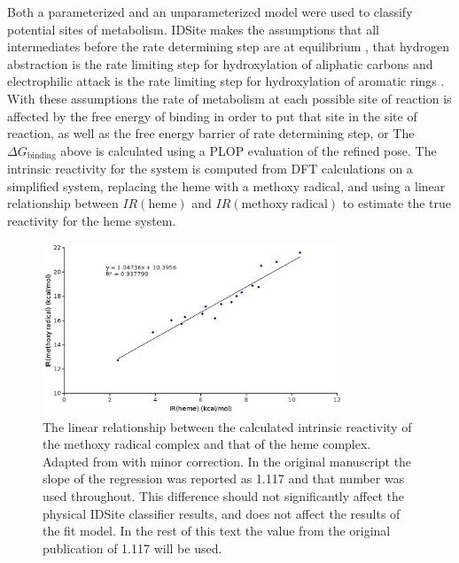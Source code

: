 Both a parameterized and an unparameterized model were used to classify potential sites of metabolism.
IDSite makes the assumptions that all intermediates before the rate determining step are at equilibrium \cite{wang2007stochastic}, that hydrogen abstraction is the rate limiting step for hydroxylation of aliphatic carbons and electrophilic attack is the rate limiting step for hydroxylation of aromatic rings \cite{guengerich2001common,shaik2005theoretical}.
With these assumptions the rate of metabolism at each possible site of reaction is affected by the free energy of binding in order to put that site in the site of reaction, as well as the free energy barrier of rate determining step, or
The ${\Delta}G_{\mathrm{binding}}$ above is calculated using a PLOP evaluation of the refined pose.
The intrinsic reactivity for the system is computed from DFT calculations on a simplified system, replacing the heme with a methoxy radical, and using a linear relationship between $IR(\mathrm{heme})$ and $IR(\mathrm{methoxy\ radical})$ to estimate the true reactivity for the heme system.
\begin{figure}[h]
\centering
\includegraphics[width=0.8\textwidth]{figures/idsite/intrinsic_corrected.png}
\caption{The linear relationship between the calculated intrinsic reactivity of the methoxy radical complex and that of the heme complex.
Adapted from \protect\cite{li2011idsite} with minor correction.
In the original manuscript the slope of the regression was reported as 1.117 and that number was used throughout.
This difference should not significantly affect the physical IDSite classifier results, and does not affect the results of the fit model.
In the rest of this text the value from the original publication of 1.117 will be used.}
\label{fig:idsite/intrinsic}
\end{figure}


